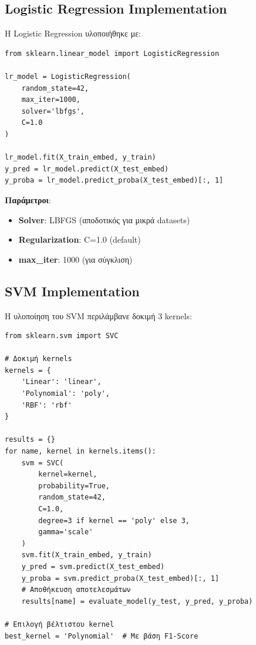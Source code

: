 \documentclass[12pt,a4paper,twoside]{book}
\begin{document}
\subsection{Logistic Regression Implementation}

Η Logistic Regression υλοποιήθηκε με:

\begin{tcolorbox}[myCustomStyle={Logistic Regression Training}]
    \begin{lstlisting}[style=myPythonStyle]
from sklearn.linear_model import LogisticRegression

lr_model = LogisticRegression(
    random_state=42,
    max_iter=1000,
    solver='lbfgs',
    C=1.0
)

lr_model.fit(X_train_embed, y_train)
y_pred = lr_model.predict(X_test_embed)
y_proba = lr_model.predict_proba(X_test_embed)[:, 1]
\end{lstlisting}
\end{tcolorbox}

\textbf{Παράμετροι}:
\begin{itemize}
    \item \textbf{Solver}: LBFGS (αποδοτικός για μικρά datasets)
    \item \textbf{Regularization}: C=1.0 (default)
    \item \textbf{max\_iter}: 1000 (για σύγκλιση)
\end{itemize}

\subsection{SVM Implementation}

Η υλοποίηση του SVM περιλάμβανε δοκιμή 3 kernels:

\begin{tcolorbox}[myCustomStyle={SVM Kernel Comparison}]
    \begin{lstlisting}[style=myPythonStyle]
from sklearn.svm import SVC

# Δοκιμή kernels
kernels = {
    'Linear': 'linear',
    'Polynomial': 'poly',
    'RBF': 'rbf'
}

results = {}
for name, kernel in kernels.items():
    svm = SVC(
        kernel=kernel,
        probability=True,
        random_state=42,
        C=1.0,
        degree=3 if kernel == 'poly' else 3,
        gamma='scale'
    )
    svm.fit(X_train_embed, y_train)
    y_pred = svm.predict(X_test_embed)
    y_proba = svm.predict_proba(X_test_embed)[:, 1]
    # Αποθήκευση αποτελεσμάτων
    results[name] = evaluate_model(y_test, y_pred, y_proba)

# Επιλογή βέλτιστου kernel
best_kernel = 'Polynomial'  # Με βάση F1-Score
\end{lstlisting}
\end{tcolorbox}
\end{document}
